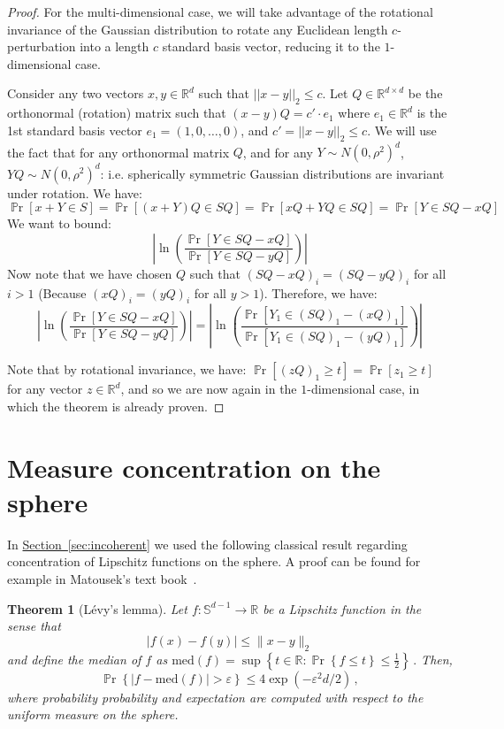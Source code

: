 \documentclass[letterpaper,11pt]{article}
\newtheorem{theorem}{Theorem}[section]
\theoremstyle{definition}
\newcommand{\sectionref}[1]{\hyperref[sec:#1]{Section~\ref{sec:#1}}}
\newcommand{\theoremlabel}[1]{\label{thm:#1}}
\newcommand{\Psymb}{\mathbb{P}}
\DeclareMathOperator*{\ProbOp}{\Psymb r}
\renewcommand{\Pr}{\ProbOp}
\newcommand{\mper}{\,.}
\newcommand{\mcom}{\,,}
\renewcommand{\leq}{\leqslant}
\renewcommand{\le}{\leqslant}
\renewcommand{\geq}{\geqslant}
\newcommand{\Set}[1]{\left\{#1\right\}}
\newcommand{\R}{\mathbb{R}}
\renewcommand{\epsilon}{\varepsilon}
\begin{document}
\begin{proof}
For the multi-dimensional case, we will take advantage of the rotational invariance of the Gaussian distribution to rotate any Euclidean length $c$-perturbation into a length $c$ standard basis vector, reducing it to the $1$-dimensional case.

Consider any two vectors $x, y \in \mathbb{R}^d$ such that $||x-y||_2 \leq c$.  Let $Q \in \mathbb{R}^{d\times d}$ be the orthonormal (rotation) matrix such that $(x-y)Q = c'\cdot e_1$ where $e_1 \in \mathbb{R}^d$ is the 1st standard basis vector $e_1 = (1, 0, \ldots, 0)$, and $c' = ||x-y||_2 \leq c$. We will use the fact that for any orthonormal matrix $Q$, and for any $Y \sim N(0,\rho^2)^d$, $YQ \sim N(0,\rho^2)^d$: i.e. spherically symmetric Gaussian distributions are invariant under rotation. We have:
$$\Pr[x + Y \in S] = \Pr[(x+Y)Q \in SQ] = \Pr[xQ + YQ  \in SQ] = \Pr[Y \in SQ-xQ]$$
We want to bound:
$$\left|\ln\left(\frac{\Pr[Y \in SQ-xQ]}{\Pr[Y \in SQ-yQ]}\right)\right|$$
 Now note that we have chosen $Q$ such that $(SQ - xQ)_i = (SQ-yQ)_i$ for all $i > 1$ (Because $(xQ)_i = (yQ)_i$ for all $y > 1$). Therefore, we have:
 $$\left|\ln\left(\frac{\Pr[Y \in SQ-xQ]}{\Pr[Y \in SQ-yQ]}\right)\right|= \left|\ln\left(\frac{\Pr[Y_1 \in (SQ)_1-(xQ)_1]}{\Pr[Y_1 \in (SQ)_1-(yQ)_1]}\right)\right|$$

Note that by rotational invariance, we have: $\Pr[(zQ)_1 \geq t] = \Pr[z_1 \geq t]$ for any vector $z \in \mathbb{R}^d$, and so we are now again in the $1$-dimensional case, in which the theorem is already proven.

\end{proof}


\section{Measure concentration on the sphere}
In \sectionref{incoherent} we used the following classical result regarding
concentration of Lipschitz functions on the sphere. A proof can be found for
example in Matousek's text book~\cite{Matousek02}.
\begin{theorem}[L\'{e}vy's lemma]\theoremlabel{levy}
Let $f\colon\mathbb{S}^{d-1}\to\R$ be a Lipschitz function in the sense that
\[
\left|f(x)-f(y)\right|\le \|x-y\|_2
\]
and define the median of $f$ as
$\mathrm{med}(f)=\sup\Set{t\in\mathbb{R}\colon\Pr\Set{f\le t}\le\frac12}\mper$
Then,
\[
\Pr\Set{ \left|f-\mathrm{med}(f)\right| > \epsilon}\le 4\exp(-\epsilon^2d/2)\mcom
\]
where probability probability and expectation are computed with respect to the
uniform measure on the sphere.
\end{theorem}
\end{document}
